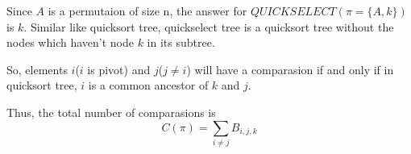         Since $A$ is a permutaion of size n, the answer for $QUICKSELECT(\pi=\{A,k\})$ is $k$. Similar like quicksort tree, quickselect tree is a quicksort tree without the nodes which haven't node $k$ in its subtree.\par
        So, elements $i$($i$ is pivot) and $j$($j\neq i$) will have a comparasion if and only if in quicksort tree, $i$ is a common ancestor of $k$ and $j$.\par
        Thus, the total number of comparasions is $$C(\pi) = \sum_{i\neq j}B_{i,j,k}$$